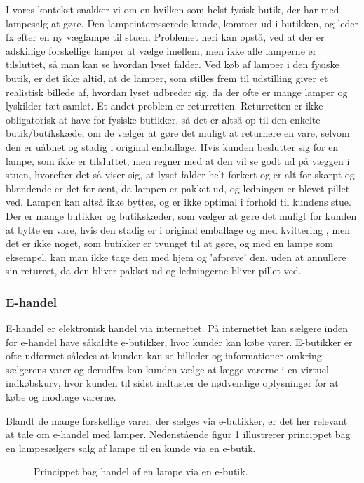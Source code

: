 I vores kontekst snakker vi om en hvilken som helst fysisk butik, der har med lampesalg at gøre. Den lampeinteresserede kunde, kommer ud i butikken, og leder fx efter en ny væglampe til stuen. Problemet heri kan opstå, ved at der er adskillige forskellige lamper at vælge imellem, men ikke alle lamperne er tilsluttet, så man kan se hvordan lyset falder. 
\newline Ved køb af lamper i den fysiske butik, er det ikke altid, at de lamper, som stilles frem til udstilling giver et realistisk billede af, hvordan lyset udbreder sig, da der ofte er mange lamper og lyskilder tæt samlet. Et andet problem er returretten. Returretten er ikke obligatorisk at have for fysiske butikker, så det er altså op til den enkelte butik/butikskæde, om de vælger at gøre det muligt at returnere en vare, selvom den er uåbnet og stadig i original emballage. \cite{fortrydelsesret} Hvis kunden beslutter sig for en lampe, som ikke er tilsluttet, men regner med at den vil se godt ud på væggen i stuen, hvorefter det så viser sig, at lyset falder helt forkert og er alt for skarpt og blændende er det for sent, da lampen er pakket ud, og ledningen er blevet pillet ved. Lampen kan altså ikke byttes, og er ikke optimal i forhold til kundens stue. Der er mange butikker og butikskæder, som vælger at gøre det muligt for kunden at bytte en vare, hvis den stadig er i original emballage og med kvittering \cite{ikea_returret}, men det er ikke noget, som butikker er tvunget til at gøre, og med en lampe som eksempel, kan man ikke tage den med hjem og ’afprøve’ den, uden at annullere sin returret, da den bliver pakket ud og ledningerne bliver pillet ved.


\subsubsection{E-handel}
E-handel er elektronisk handel via internettet\cite{ddo_ehandel}. På internettet kan sælgere inden for e-handel have såkaldte e-butikker, hvor kunder kan købe varer\cite{ddo_ebutik}. E-butikker er ofte udformet således at kunden kan se billeder og informationer omkring sælgerens varer og derudfra kan kunden vælge at lægge varerne i en virtuel indkøbskurv, hvor kunden til sidst indtaster de nødvendige oplysninger for at købe og modtage varerne.


Blandt de mange forskellige varer, der sælges via e-butikker, er det her relevant at tale om e-handel med lamper. Nedenstående figur \ref{fig:e_handel_med_lamper} illustrerer princippet bag en lampesælgers salg af lampe til en kunde via en e-butik.
\begin{figure}[H]
	\centering
	\def\svgwidth{\columnwidth}
	
	\caption{Princippet bag handel af en lampe via en e-butik.}
    \label{fig:e_handel_med_lamper}
\end{figure}

